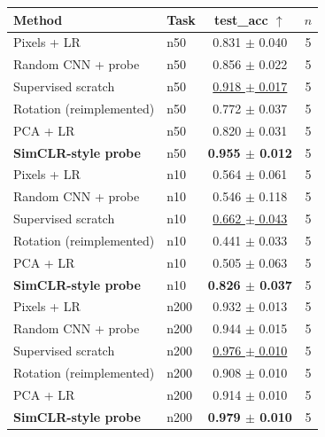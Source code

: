 \begin{tabular}{llcc}
\toprule
Method & Task & test\_acc $\uparrow$ & $n$ \\
\midrule
Pixels + LR & n50 & 0.831 $\pm$ 0.040 & 5 \\
Random CNN + probe & n50 & 0.856 $\pm$ 0.022 & 5 \\
Supervised scratch & n50 & \underline{0.918 $\pm$ 0.017} & 5 \\
Rotation (reimplemented) & n50 & 0.772 $\pm$ 0.037 & 5 \\
PCA + LR & n50 & 0.820 $\pm$ 0.031 & 5 \\
\textbf{SimCLR-style probe} & n50 & \textbf{0.955 $\pm$ 0.012} & 5 \\
\midrule
Pixels + LR & n10 & 0.564 $\pm$ 0.061 & 5 \\
Random CNN + probe & n10 & 0.546 $\pm$ 0.118 & 5 \\
Supervised scratch & n10 & \underline{0.662 $\pm$ 0.043} & 5 \\
Rotation (reimplemented) & n10 & 0.441 $\pm$ 0.033 & 5 \\
PCA + LR & n10 & 0.505 $\pm$ 0.063 & 5 \\
\textbf{SimCLR-style probe} & n10 & \textbf{0.826 $\pm$ 0.037} & 5 \\
\midrule
Pixels + LR & n200 & 0.932 $\pm$ 0.013 & 5 \\
Random CNN + probe & n200 & 0.944 $\pm$ 0.015 & 5 \\
Supervised scratch & n200 & \underline{0.976 $\pm$ 0.010} & 5 \\
Rotation (reimplemented) & n200 & 0.908 $\pm$ 0.010 & 5 \\
PCA + LR & n200 & 0.914 $\pm$ 0.010 & 5 \\
\textbf{SimCLR-style probe} & n200 & \textbf{0.979 $\pm$ 0.010} & 5 \\
\bottomrule
\end{tabular}
